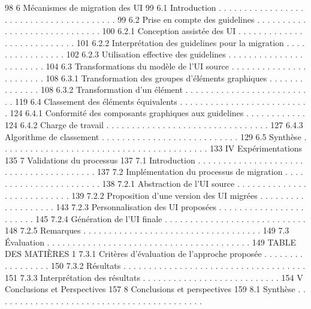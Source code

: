 \documentclass{article}
\begin{document}
98
6
M\'{e}canismes de migration des UI
99
6.1
Introduction . . . . . . . . . . . . . . . . . . . . . . . . . . . . . . . . . . . . . . .
99
6.2
Prise en compte des guidelines . . . . . . . . . . . . . . . . . . . . . . . . . . . . .
100
6.2.1
Conception assist\'{e}e des UI . . . . . . . . . . . . . . . . . . . . . . . . . . .
101
6.2.2
Interpr\'{e}tation des guidelines pour la migration
. . . . . . . . . . . . . . . .
102
6.2.3
Utilisation effective des guidelines . . . . . . . . . . . . . . . . . . . . . . .
104
6.3
Transformations du mod\`{e}le de l’UI source . . . . . . . . . . . . . . . . . . . . . . .
108
6.3.1
Transformation des groupes d’\'{e}l\'{e}ments graphiques . . . . . . . . . . . . . .
108
6.3.2
Transformation d’un \'{e}l\'{e}ment . . . . . . . . . . . . . . . . . . . . . . . . . .
119
6.4
Classement des \'{e}l\'{e}ments \'{e}quivalents . . . . . . . . . . . . . . . . . . . . . . . . . .
124
6.4.1
Conformit\'{e} des composants graphiques aux guidelines . . . . . . . . . . . .
124
6.4.2
Charge de travail . . . . . . . . . . . . . . . . . . . . . . . . . . . . . . . .
127
6.4.3
Algorithme de classement
. . . . . . . . . . . . . . . . . . . . . . . . . . .
129
6.5
Synth\`{e}se . . . . . . . . . . . . . . . . . . . . . . . . . . . . . . . . . . . . . . . . .
133
IV
Exp\'{e}rimentations
135
7
Validations du processus
137
7.1
Introduction . . . . . . . . . . . . . . . . . . . . . . . . . . . . . . . . . . . . . . .
137
7.2
Impl\'{e}mentation du processus de migration . . . . . . . . . . . . . . . . . . . . . . .
138
7.2.1
Abstraction de l’UI source . . . . . . . . . . . . . . . . . . . . . . . . . . .
139
7.2.2
Proposition d’une version des UI migr\'{e}es . . . . . . . . . . . . . . . . . . .
143
7.2.3
Personnalisation des UI propos\'{e}es . . . . . . . . . . . . . . . . . . . . . . .
145
7.2.4
G\'{e}n\'{e}ration de l’UI ﬁnale . . . . . . . . . . . . . . . . . . . . . . . . . . . .
148
7.2.5
Remarques . . . . . . . . . . . . . . . . . . . . . . . . . . . . . . . . . . .
149
7.3
Évaluation . . . . . . . . . . . . . . . . . . . . . . . . . . . . . . . . . . . . . . . .
149
TABLE DES MATIÈRES
1
7.3.1
Crit\`{e}res d’\'{e}valuation de l’approche propos\'{e}e
. . . . . . . . . . . . . . . . .
150
7.3.2
R\'{e}sultats
. . . . . . . . . . . . . . . . . . . . . . . . . . . . . . . . . . . .
151
7.3.3
Interpr\'{e}tation des r\'{e}sultats . . . . . . . . . . . . . . . . . . . . . . . . . . .
154
V
Conclusions et Perspectives
157
8
Conclusions et perspectives
159
8.1
Synth\`{e}se . . . . . . . . . . . . . . . . . . . . . . . . . . . . . . . . . . . . . . . . .
\end{document}
